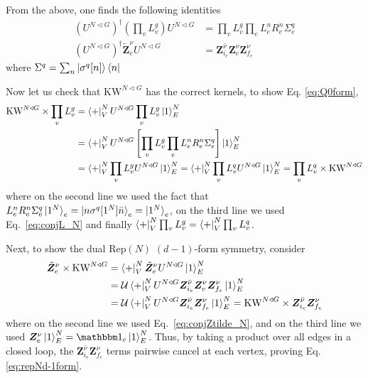 \documentclass[nofootinbib,prx,twocolumn,showpacs,superscriptaddress,notitlepage,amsmath,amssymb]{revtex4-2}
\theoremstyle{definition}
\def\KW{\text{KW}}
\def\Rep{\text{Rep}}
\def\bra#1{\mathinner{\langle{#1}|}}
\def\ket#1{\mathinner{|{#1}\rangle}}
\def\bs#1{\boldsymbol{#1}}
\begin{document}
From the above, one finds the following identities
\begin{align}
   (U^{N \triangleleft G})^\dagger \left( \prod_v L^g_v \right)  U^{N \triangleleft G} &= \prod_v L^g_v \prod_e L^n_e R^n_e \Sigma^q_e \label{eq:conjL_N}\\
 (U^{N \triangleleft G})^\dagger \tilde{\bs Z}^\nu_e  U^{N \triangleleft G}& = {\bs Z}^{\bar\nu}_{i_e} {\bs Z}^{\nu}_{e} {\bs Z}^{\nu}_{f_e} \label{eq:conjZtilde_N}
\end{align}
where $\Sigma^q = \sum_n \ket{\sigma^q[n]}\bra{n}$


Now let us check that $\KW^{N \triangleleft G}$ has the correct kernels, to show Eq. \eqref{eq:Q0form},
\begin{align}
\KW^{N \triangleleft G}  \times \prod_v L^g_v &=\bra{+}^N_V U^{N \triangleleft G} \prod_v L^g_v \ket{1}^N_E \nonumber \\
&=\bra{+}^N_VU^{N \triangleleft G} \left[\prod_v L^g_v \prod_e L^n_e R^n_e \Sigma^q_e\right]  \ket{1}^N_E \\
&=\bra{+}^N_V \prod_v L^g_v U^{N \triangleleft G}   \ket{1}^N_E = \bra{+}^N_V \prod_v L^q_v U^{N \triangleleft G}   \ket{1}^N_E =\prod_v L^q_v \times  \KW^{N \triangleleft G}
\end{align}
where on the second line we used the fact that $L^n_e R^n_e \Sigma^q_e\ket{1^N}_e =\ket{n\sigma^q[1^N]\bar n}_e = \ket{1^N}_e$, on the third line we used Eq.~\eqref{eq:conjL_N} and finally $\bra{+}^N_V \prod_v L^g_v = \bra{+}^N_V \prod_v L^q_v$.


Next, to show the dual $\Rep(N)$ $(d-1)$-form symmetry, consider
\begin{align}
     \tilde{\bs  Z}^{\nu}_e \times \KW^{N\triangleleft G} &= \bra{+}^N_V \tilde{\bs  Z}^{\nu}_e   U^{N \triangleleft G} \ket{1}^N_E\\
&=\mathcal U \bra{+}^N_V  U^{N \triangleleft G}    {\bs Z}^{\bar\nu}_{i_e} {\bs Z}^{\nu}_{e} {\bs Z}^{\nu}_{f_e} \ket{1}^N_E\\
&=\mathcal U \bra{+}^N_V  U^{N \triangleleft G} {\bs Z}^{\bar\nu}_{i_e}  {\bs Z}^{\nu}_{f_e} \ket{1}^N_E=\KW^{N\triangleleft G} \times   {\bs Z}^{\bar\nu}_{i_e}  {\bs Z}^{\nu}_{f_e}
\end{align}
where on the second line we used  Eq.~\eqref{eq:conjZtilde_N}, and on the third line we used $\bs Z^\nu_e\ket{1}^N_E = \mathbbm 1_e\ket{1}^N_E$. Thus, by taking a product over all edges in a closed loop, the  ${\bs Z}^{\bar\nu}_{i_e}  {\bs Z}^{\nu}_{f_e}$ terms pairwise cancel at each vertex, proving Eq. \eqref{eq:repNd-1form}.
\end{document}
